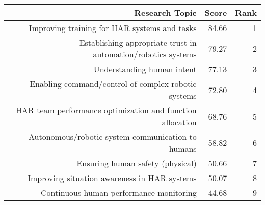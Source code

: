 \begin{tabular}{*{3}{r}}
    \toprule
    Research Topic                                                & Score & Rank \\
    \midrule
    Improving training for HAR systems and tasks                  & 84.66 & 1    \\
    Establishing appropriate trust in automation/robotics systems & 79.27 & 2    \\
    Understanding human intent                                    & 77.13 & 3    \\
    Enabling command/control of complex robotic systems           & 72.80 & 4    \\
    HAR team performance optimization and function allocation     & 68.76 & 5    \\
    Autonomous/robotic system communication to humans             & 58.82 & 6    \\
    Ensuring human safety (physical)                              & 50.66 & 7    \\
    Improving situation awareness in HAR systems                  & 50.07 & 8    \\
    Continuous human performance monitoring                       & 44.68 & 9    \\
    \bottomrule
\end{tabular}
